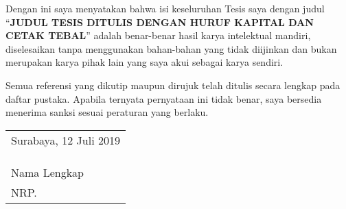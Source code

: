 \begin{spacing}{1.5}

Dengan ini saya menyatakan bahwa isi keseluruhan Tesis saya dengan judul “\textbf{JUDUL TESIS DITULIS DENGAN HURUF KAPITAL DAN CETAK TEBAL}” adalah benar-benar hasil karya intelektual mandiri, diselesaikan tanpa menggunakan bahan-bahan yang tidak diijinkan dan bukan merupakan karya pihak lain yang saya akui sebagai karya sendiri.

Semua referensi yang dikutip maupun dirujuk telah ditulis secara lengkap pada daftar pustaka. Apabila ternyata pernyataan ini tidak benar, saya bersedia menerima sanksi sesuai peraturan yang berlaku.

\vspace{1ex}

\end{spacing}
\begin{flushright}
\begin{tabular}[b]{l}
    Surabaya, 12 Juli 2019 \\
    \\
    \\
    \\
    Nama Lengkap\\
    NRP.
\end{tabular}
\end{flushright}